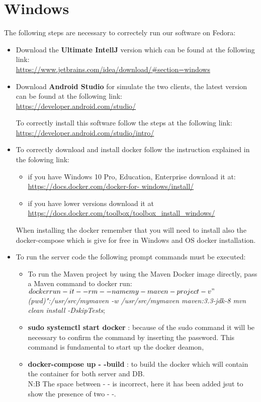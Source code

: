 \section{Windows}
The following steps are necessary to correctely run our software on Fedora:
\begin{itemize}
	\item Download the \textbf{Ultimate IntellJ} version which can be found at the following link:\\
 		\url{https://www.jetbrains.com/idea/download/#section=windows}

	\item Download \textbf{Android Studio} for simulate the two clients, the latest version can be found at the following link:\\
		\url{https://developer.android.com/studio/}

		To correctly install this software follow the steps at the following link:\\
		\url{https://developer.android.com/studio/intro/}

	\item To correctly download and install docker follow the instruction explained in the folowing link:\\
		\begin{itemize}
		\item if you have Windows 10 Pro, Education, Enterprise download it at: \url{https://docs.docker.com/docker-for-					windows/install/}\\
		\item if you have lower versions download it at \url{https://docs.docker.com/toolbox/toolbox_install_windows/}
		\end{itemize}
	When installing the docker remember that you will need to install also the docker-compose which is give for free in Windows 			and OS docker installation.

	\item To run the server code the following prompt commands must be executed:\\
		\begin{itemize}
			\item To run the  Maven project by using the Maven Docker image directly, pass a Maven command to docker 					run:\\
\textit{$ docker run -it --rm --name my-maven-project -v "$(pwd)":/usr/src/mymaven -w /usr/src/mymaven maven:3.3-jdk-8 mvn clean install -DskipTests};
			\item \textbf{ sudo systemctl start docker} : because of the sudo command it will be necessary to confirm the 					command by inserting the password. This command is fundamental to start up the docker deamon,	
			\item \textbf{ docker-compose up - -build} : to build the docker which will contain the container for both server 					and DB.\\N:B The space between - - is incorrect, here it has been added jsut to show the presence of two - -.
		\end{itemize}


\end{itemize}
